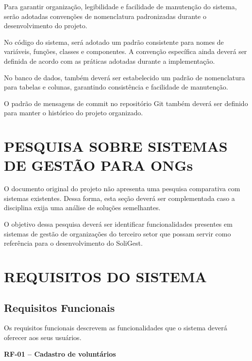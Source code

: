\documentclass[12pt,a4paper]{article}
\begin{document}
Para garantir organização, legibilidade e facilidade de manutenção do
sistema, serão adotadas convenções de nomenclatura padronizadas durante
o desenvolvimento do projeto.

No código do sistema, será adotado um padrão consistente para nomes de
variáveis, funções, classes e componentes. A convenção específica ainda
deverá ser definida de acordo com as práticas adotadas durante a
implementação.

No banco de dados, também deverá ser estabelecido um padrão de
nomenclatura para tabelas e colunas, garantindo consistência e
facilidade de manutenção.

O padrão de mensagens de commit no repositório Git também deverá ser
definido para manter o histórico do projeto organizado.


\section*{PESQUISA SOBRE SISTEMAS DE GESTÃO PARA ONGs}

O documento original do projeto não apresenta uma pesquisa comparativa
com sistemas existentes. Dessa forma, esta seção deverá ser
complementada caso a disciplina exija uma análise de soluções
semelhantes.

O objetivo dessa pesquisa deverá ser identificar funcionalidades
presentes em sistemas de gestão de organizações do terceiro setor que
possam servir como referência para o desenvolvimento do SoliGest.


\section*{REQUISITOS DO SISTEMA}

\subsection*{Requisitos Funcionais}

Os requisitos funcionais descrevem as funcionalidades que o sistema
deverá oferecer aos seus usuários.

\textbf{RF-01 -- Cadastro de voluntários}
\end{document}

